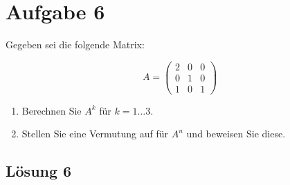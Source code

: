 \documentclass[main.tex]{subfiles}
\begin{document}
\section{Aufgabe 6}
Gegeben sei die folgende Matrix:

\begin{equation*}
    A = \begin{pmatrix}
        2 & 0 & 0 \\
        0 & 1 & 0 \\
        1 & 0 & 1
    \end{pmatrix}
\end{equation*}

\begin{enumerate}
    \item Berechnen Sie $A^k$ für $k=1 \ldots 3$.
    \item Stellen Sie eine Vermutung auf für $A^n$ und beweisen Sie diese.
\end{enumerate}

\subsection{Lösung 6}
\end{document}

